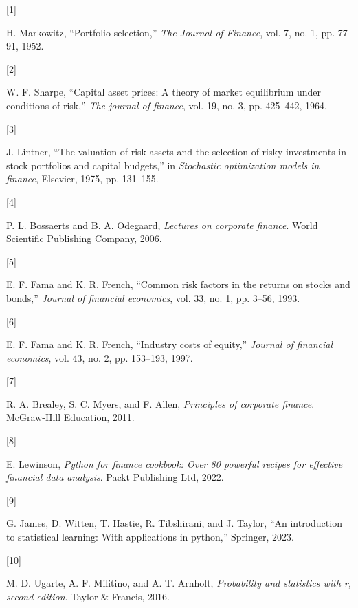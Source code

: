 \documentclass[
  12pt,
  letterpaper,
]{book}
\newlength{\cslhangindent}
\newlength{\csllabelwidth}
\newenvironment{CSLReferences}[2] %
 {\begin{list}{}{%
  \setlength{\itemindent}{0pt}
  \setlength{\leftmargin}{0pt}
  \setlength{\parsep}{0pt}
  \ifodd #1
   \setlength{\leftmargin}{\cslhangindent}
   \setlength{\itemindent}{-1\cslhangindent}
  \fi
  \setlength{\itemsep}{#2\baselineskip}}}
 {\end{list}}
\newcommand{\CSLLeftMargin}[1]{\parbox[t]{\csllabelwidth}{\strut#1\strut}}
\newcommand{\CSLRightInline}[1]{\parbox[t]{\linewidth - \csllabelwidth}{\strut#1\strut}}
\begin{document}
\label{refs}
\begin{CSLReferences}{0}{0}
\CSLLeftMargin{{[}1{]} }%
\CSLRightInline{H. Markowitz, {``Portfolio selection,''} \emph{The
Journal of Finance}, vol. 7, no. 1, pp. 77--91, 1952.}

\CSLLeftMargin{{[}2{]} }%
\CSLRightInline{W. F. Sharpe, {``Capital asset prices: A theory of
market equilibrium under conditions of risk,''} \emph{The journal of
finance}, vol. 19, no. 3, pp. 425--442, 1964.}

\CSLLeftMargin{{[}3{]} }%
\CSLRightInline{J. Lintner, {``The valuation of risk assets and the
selection of risky investments in stock portfolios and capital
budgets,''} in \emph{Stochastic optimization models in finance},
Elsevier, 1975, pp. 131--155.}

\CSLLeftMargin{{[}4{]} }%
\CSLRightInline{P. L. Bossaerts and B. A. Odegaard, \emph{Lectures on
corporate finance}. World Scientific Publishing Company, 2006.}

\CSLLeftMargin{{[}5{]} }%
\CSLRightInline{E. F. Fama and K. R. French, {``Common risk factors in
the returns on stocks and bonds,''} \emph{Journal of financial
economics}, vol. 33, no. 1, pp. 3--56, 1993.}

\CSLLeftMargin{{[}6{]} }%
\CSLRightInline{E. F. Fama and K. R. French, {``Industry costs of
equity,''} \emph{Journal of financial economics}, vol. 43, no. 2, pp.
153--193, 1997.}

\CSLLeftMargin{{[}7{]} }%
\CSLRightInline{R. A. Brealey, S. C. Myers, and F. Allen,
\emph{Principles of corporate finance}. McGraw-Hill Education, 2011.}

\CSLLeftMargin{{[}8{]} }%
\CSLRightInline{E. Lewinson, \emph{Python for finance cookbook: Over 80
powerful recipes for effective financial data analysis}. Packt
Publishing Ltd, 2022.}

\CSLLeftMargin{{[}9{]} }%
\CSLRightInline{G. James, D. Witten, T. Hastie, R. Tibshirani, and J.
Taylor, {``An introduction to statistical learning: With applications in
python,''} Springer, 2023.}

\CSLLeftMargin{{[}10{]} }%
\CSLRightInline{M. D. Ugarte, A. F. Militino, and A. T. Arnholt,
\emph{Probability and statistics with r, second edition}. Taylor \&
Francis, 2016.}


\end{CSLReferences}
\end{document}
